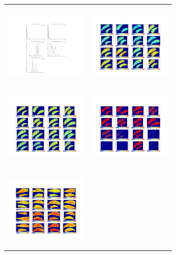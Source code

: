 \begin{tabular}{ |c|c| }
\includegraphics[width=4.0cm,height=4.0cm]{images/MachineVision/MachineVision_Pathology_ExampleSlides_Page_03.jpg} &
\includegraphics[width=4.0cm,height=4.0cm]{images/MachineVision/MachineVision_Pathology_ExampleSlides_Page_05.jpg} \\
\includegraphics[width=4.0cm,height=4.0cm]{images/MachineVision/MachineVision_Pathology_ExampleSlides_Page_06.jpg} &
\includegraphics[width=4.0cm,height=4.0cm]{images/MachineVision/MachineVision_Pathology_ExampleSlides_Page_07.jpg} \\
\includegraphics[width=4.0cm,height=4.0cm]{images/MachineVision/MachineVision_Pathology_ExampleSlides_Page_08.jpg} &

\end{tabular}
